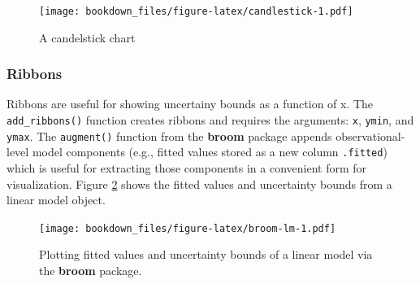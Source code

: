 \documentclass[12pt,]{isuthesis}
\newenvironment{Shaded}{\begin{snugshade}}{\end{snugshade}}
\newcommand{\KeywordTok}[1]{\textcolor[rgb]{0.13,0.29,0.53}{\textbf{{#1}}}}
\newcommand{\DataTypeTok}[1]{\textcolor[rgb]{0.13,0.29,0.53}{{#1}}}
\newcommand{\FloatTok}[1]{\textcolor[rgb]{0.00,0.00,0.81}{{#1}}}
\newcommand{\StringTok}[1]{\textcolor[rgb]{0.31,0.60,0.02}{{#1}}}
\newcommand{\OtherTok}[1]{\textcolor[rgb]{0.56,0.35,0.01}{{#1}}}
\newcommand{\NormalTok}[1]{{#1}}
\begin{document}
\begin{figure}[htbp]
\centering
\texttt{[image: bookdown\_files/figure-latex/candlestick-1.pdf]}
\caption{\label{fig:candlestick}A candelstick chart}
\end{figure}

\subsubsection{Ribbons}\label{ribbons}

Ribbons are useful for showing uncertainy bounds as a function of x. The
\texttt{add\_ribbons()} function creates ribbons and requires the
arguments: \texttt{x}, \texttt{ymin}, and \texttt{ymax}. The
\texttt{augment()} function from the \textbf{broom} package appends
observational-level model components (e.g., fitted values stored as a
new column \texttt{.fitted}) which is useful for extracting those
components in a convenient form for visualization. Figure
\ref{fig:broom-lm} shows the fitted values and uncertainty bounds from a
linear model object.

\begin{Shaded}
\end{Shaded}

\begin{figure}[htbp]
\centering
\texttt{[image: bookdown\_files/figure-latex/broom-lm-1.pdf]}
\caption{\label{fig:broom-lm}Plotting fitted values and uncertainty bounds
of a linear model via the \textbf{broom} package.}
\end{figure}
\end{document}

